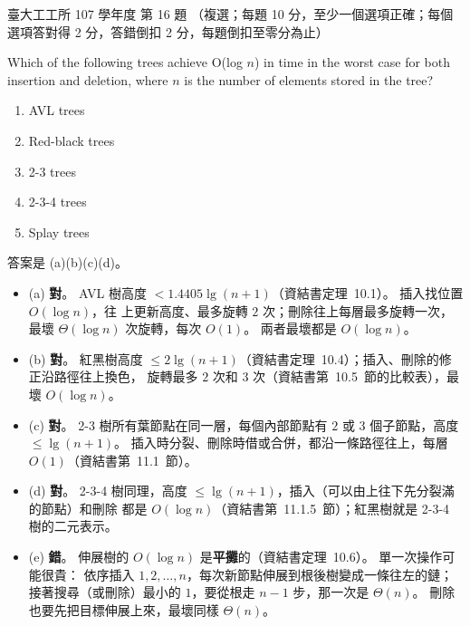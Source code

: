 \begin{pastexam}[label={px:ntu-107-ie-ds-16}]{臺大工工所 107 學年度 第 16 題}
（複選；每題 10 分，至少一個選項正確；每個選項答對得 2 分，答錯倒扣 2 分，每題倒扣至零分為止）

Which of the following trees achieve O(log $n$) in time in the worst case for both insertion and deletion, where $n$ is the number of elements stored in the tree?
\begin{enumerate}[label=(\alph*),nosep]
\item AVL trees
\item Red-black trees
\item 2-3 trees
\item 2-3-4 trees
\item Splay trees
\end{enumerate}
\end{pastexam}

\begin{pastsoln}
答案是 (a)(b)(c)(d)。

\begin{itemize}
\item (a) \textbf{對}。 AVL 樹高度 $< 1.4405\lg(n+1)$（資結書定理~10.1）。 插入找位置 $O(\log n)$，往
上更新高度、最多旋轉 $2$ 次；刪除往上每層最多旋轉一次，最壞 $\Theta(\log n)$ 次旋轉，每次 $O(1)$。
兩者最壞都是 $O(\log n)$。
\item (b) \textbf{對}。 紅黑樹高度 $\le 2\lg(n+1)$（資結書定理~10.4）；插入、刪除的修正沿路徑往上換色，
旋轉最多 $2$ 次和 $3$ 次（資結書第~10.5~節的比較表），最壞 $O(\log n)$。
\item (c) \textbf{對}。 2-3 樹所有葉節點在同一層，每個內部節點有 $2$ 或 $3$ 個子節點，高度
$\le \lg(n+1)$。 插入時分裂、刪除時借或合併，都沿一條路徑往上，每層 $O(1)$（資結書第~11.1~節）。
\item (d) \textbf{對}。 2-3-4 樹同理，高度 $\le \lg(n+1)$，插入（可以由上往下先分裂滿的節點）和刪除
都是 $O(\log n)$（資結書第~11.1.5~節）；紅黑樹就是 2-3-4 樹的二元表示。
\item (e) \textbf{錯}。 伸展樹的 $O(\log n)$ 是\textbf{平攤}的（資結書定理~10.6）。 單一次操作可能很貴：
依序插入 $1, 2, \ldots, n$，每次新節點伸展到根後樹變成一條往左的鏈；接著搜尋（或刪除）最小的
$1$，要從根走 $n - 1$ 步，那一次是 $\Theta(n)$。 刪除也要先把目標伸展上來，最壞同樣 $\Theta(n)$。
\end{itemize}
\end{pastsoln}
